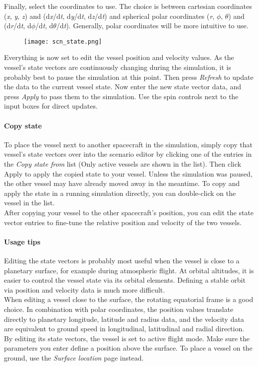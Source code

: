 \documentclass[Orbiter User Manual.tex]{subfiles}
\begin{document}
\noindent
Finally, select the coordinates to use. The choice is between cartesian coordinates (\textit{x}, \textit{y}, \textit{z}) and (d\textit{x}/d\textit{t}, d\textit{y}/d\textit{t}, d\textit{z}/d\textit{t}) and spherical polar coordinates (\textit{r}, $\phi$, $\theta$) and (d\textit{r}/d\textit{t}, d$\phi$/d\textit{t}, d$\theta$/d\textit{t}). Generally, polar coordinates will be more intuitive to use.

\begin{figure}[H]
	\centering
	\texttt{[image: scn\_state.png]}
\end{figure}

\noindent
Everything is now set to edit the vessel position and velocity values. As the vessel's state vectors are continuously changing during the simulation, it is probably best to pause the simulation at this point. Then press \textit{Refresh} to update the data to the current vessel state. Now enter the new state vector data, and press \textit{Apply} to pass them to the simulation. Use the spin controls next to the input boxes for direct updates.

\paragraph{Copy state}
To place the vessel next to another spacecraft in the simulation, simply copy that vessel's state vectors over into the scenario editor by clicking one of the entries in the \textit{Copy state from} list (Only active vessels are shown in the list). Then click Apply to apply the copied state to your vessel. Unless the simulation was paused, the other vessel may have already moved away in the meantime. To copy and apply the state in a running simulation directly, you can double-click on the vessel in the list.\\
After copying your vessel to the other spacecraft's position, you can edit the state vector entries to fine-tune the relative position and velocity of the two vessels.

\paragraph{Usage tips}
Editing the state vectors is probably most useful when the vessel is close to a planetary surface, for example during atmospheric flight. At orbital altitudes, it is easier to control the vessel state via its orbital elements. Defining a stable orbit via position and velocity data is much more difficult.\\
When editing a vessel close to the surface, the rotating equatorial frame is a good choice. In combination with polar coordinates, the position values translate directly to planetary longitude, latitude and radius data, and the velocity data are equivalent to ground speed in longitudinal, latitudinal and radial direction.\\
By editing its state vectors, the vessel is set to active flight mode. Make sure the parameters you enter define a position above the surface. To place a vessel on the ground, use the \textit{Surface location} page instead.
\end{document}
